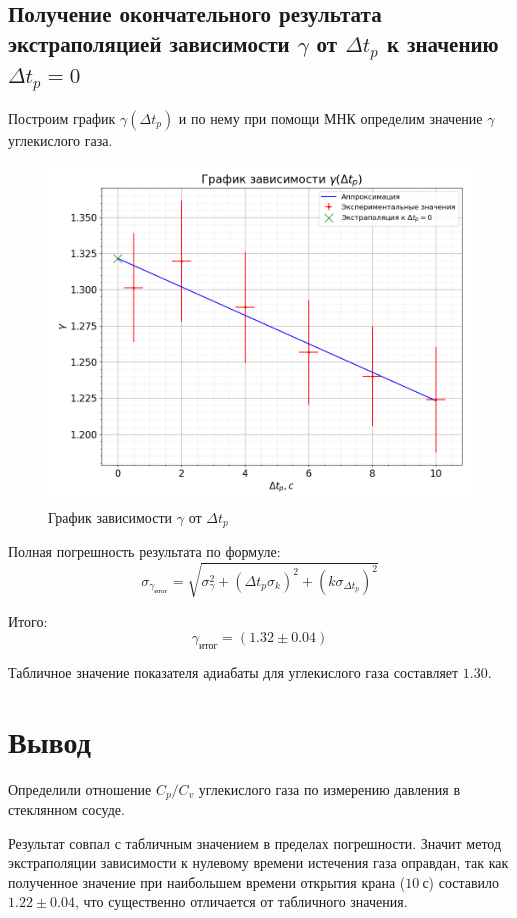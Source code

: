 \documentclass[a4paper, 12pt]{article}
\begin{document}
		\subsection{Получение окончательного результата экстраполяцией зависимости $\gamma$ от $\Delta t_p$ к значению $\Delta t_p = 0$}

		Построим график $\gamma(\Delta t_p)$ и по нему при помощи МНК определим значение $\gamma$ углекислого газа.

		\begin{figure}[!ht]
			\begin{center}
				\includegraphics[width=0.6 \textwidth]{img/plot_gamma_t.png}
			\end{center}
			\caption{График зависимости $\gamma$ от $\Delta t_p$}
			\label{plot:gamma_t}
		\end{figure}

		Полная погрешность результата по формуле:
		$$
			\sigma_{\gamma_{итог}} = \sqrt{\sigma_{\gamma}^2 + \left( \Delta t_p \sigma_k \right)^2 + \left( k \sigma_{\Delta t_p} \right)^2}
		$$

		Итого:
		$$
			\gamma_{итог} = (1.32 \pm 0.04)
		$$

		Табличное значение показателя адиабаты для углекислого газа составляет $1.30$.

	\section{Вывод}

		Определили отношение $C_p / C_v$ углекислого газа по измерению давления в стеклянном сосуде.

		Результат совпал с табличным значением в пределах погрешности. Значит метод экстраполяции зависимости к нулевому времени истечения газа оправдан, так как полученное значение при наибольшем времени открытия крана ($10~с$) составило $1.22 \pm 0.04$, что существенно отличается от табличного значения.
\end{document}
